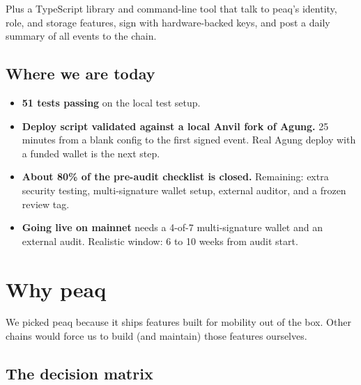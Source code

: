 \documentclass[11pt,a4paper]{article}
\begin{document}
Plus a TypeScript library and command-line tool that talk to peaq's identity, role, and storage features, sign with hardware-backed keys, and post a daily summary of all events to the chain.

\subsection{Where we are today}

\begin{successbox}[title=Status]
\begin{itemize}[leftmargin=*, nosep]
  \item \textbf{51 tests passing} on the local test setup.
  \item \textbf{Deploy script validated against a local Anvil fork of Agung.} 25 minutes from a blank config to the first signed event. Real Agung deploy with a funded wallet is the next step.
  \item \textbf{About 80\% of the pre-audit checklist is closed.} Remaining: extra security testing, multi-signature wallet setup, external auditor, and a frozen review tag.
  \item \textbf{Going live on mainnet} needs a 4-of-7 multi-signature wallet and an external audit. Realistic window: 6 to 10 weeks from audit start.
\end{itemize}
\end{successbox}

\newpage

\section{Why peaq}

We picked peaq because it ships features built for mobility out of the box. Other chains would force us to build (and maintain) those features ourselves.

\subsection{The decision matrix}
\end{document}
